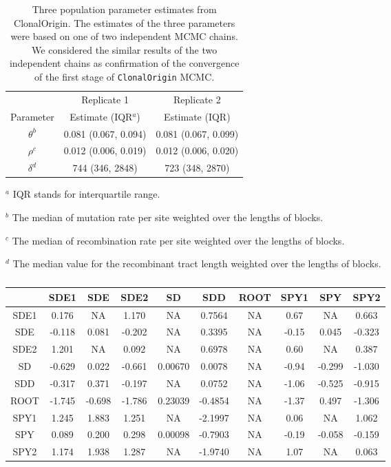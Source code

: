 \documentclass[english]{article}
\providecommand{\tabularnewline}{\\}
\begin{document}
\begin{table}
\caption{\label{tab:three}Three population parameter estimates from
ClonalOrigin. 
The estimates of the three parameters were based on one of two independent
MCMC chains.  We considered the similar 
results of the two independent chains as confirmation of 
the convergence of the first stage of \texttt{ClonalOrigin} MCMC.
}
\noindent \centering{}\begin{tabular}{ccc}
& Replicate 1 & Replicate 2\tabularnewline
Parameter & Estimate (IQR$^a$) & Estimate (IQR)\tabularnewline
\hline
$\theta^b$ & 0.081 (0.067, 0.094) & 0.081 (0.067, 0.099)\tabularnewline
$\rho^c$ & 0.012 (0.006, 0.019) & 0.012 (0.006, 0.020)\tabularnewline
$\delta^d$ & 744 (346, 2848) & 723 (348, 2870)\tabularnewline
\hline
\end{tabular}

$^a$ IQR stands for interquartile range.

$^b$ The median of mutation rate per site weighted over the lengths of blocks. 

$^c$ The median of recombination rate per site weighted over the lengths of blocks.

$^d$ The median value for the recombinant tract length weighted over the lengths of blocks.

\end{table}
\clearpage{}

\begin{table}
\caption{\label{tab:heatmap}}
\noindent \centering{}\begin{tabular}{cccccccccc}
\hline
& SDE1 & SDE & SDE2 & SD & SDD & ROOT & SPY1 & SPY & SPY2 \tabularnewline
\hline
SDE1& 0.176  &   NA  &1.170  &    NA & 0.7564  & NA & 0.67 &    NA & 0.663\tabularnewline
SDE & -0.118 & 0.081 &-0.202 &     NA&  0.3395 &  NA& -0.15&  0.045& -0.323\tabularnewline
SDE2& 1.201  &   NA  &0.092  &    NA & 0.6978  & NA & 0.60 &    NA & 0.387\tabularnewline
SD  & -0.629 & 0.022 &-0.661 &0.00670&  0.0078 &  NA& -0.94& -0.299& -1.030\tabularnewline
SDD & -0.317 & 0.371 &-0.197 &     NA&  0.0752 &  NA& -1.06& -0.525& -0.915\tabularnewline
ROOT& -1.745 &-0.698 &-1.786 &0.23039& -0.4854 &  NA& -1.37&  0.497& -1.306\tabularnewline
SPY1& 1.245  &1.883  &1.251  &    NA &-2.1997  & NA & 0.06 &    NA & 1.062\tabularnewline
SPY & 0.089  &0.200  &0.298 &0.00098 &-0.7903  & NA &-0.19 &-0.058 &-0.159\tabularnewline
SPY2& 1.174  &1.938  &1.287  &    NA &-1.9740  & NA & 1.07 &    NA & 0.063\tabularnewline
\hline
\end{tabular}
\end{table}
\clearpage{}
\end{document}
